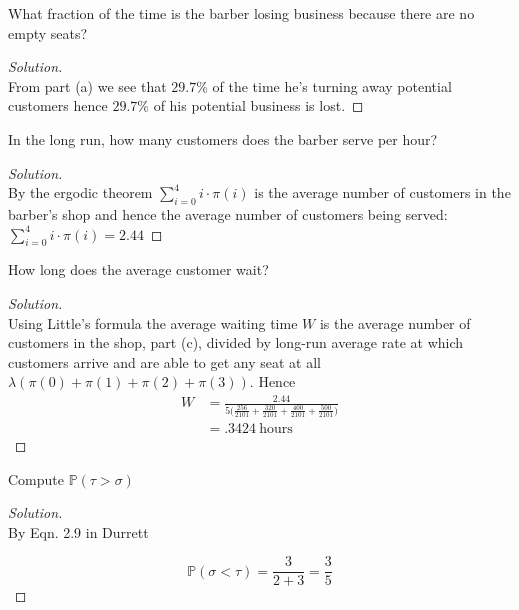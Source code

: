 \documentclass[12pt]{article}
\newenvironment{problem}[2][Problem]{\begin{trivlist}
\item[\hskip \labelsep {\bfseries #1}\hskip \labelsep {\bfseries #2.}]}{\end{trivlist}}
\newenvironment{solution}
  {\begin{proof}[Solution]\renewcommand{\qedsymbol}{}}
  {\end{proof}}
\begin{document}
\begin{problem}{2(b)} 
What fraction of the time is the barber losing business because there are no empty seats?
\end{problem}
\begin{solution}\ \\

From part (a) we see that $29.7\%$ of the time he's turning away potential customers hence $29.7\%$ of his potential business is lost.
\end{solution}

\begin{problem}{2(c)} 
In the long run, how many customers does the barber serve per hour?
\end{problem}
\begin{solution}\ \\

By the ergodic theorem $\sum_{i=0}^4 i\cdot \pi(i)$ is the average number of customers in the barber's shop and hence the average number of customers being served: $\sum_{i=0}^4 i\cdot \pi(i) = 2.44 $

\end{solution}

\begin{problem}{2(d)} 
How long does the average customer wait?
\end{problem}
\begin{solution}\ \\

Using Little's formula the average waiting time $W$ is the average number of customers in the shop, part (c), divided by long-run average rate at which customers arrive and are able to get any seat at all $\lambda(\pi(0)+\pi(1)+\pi(2)+\pi(3))$. Hence
\begin{align*}
W &= \frac{2.44}{5\bigg(\frac{256}{2101} + \frac{320}{2101} + \frac{400}{2101} +  \frac{500}{2101}\bigg)} \\
&= .3424 ~\text{hours}
\end{align*}

\end{solution}

\begin{problem}{3(a)}

Compute $\mathbb{P}({\tau > \sigma})$

\end{problem}
\begin{solution}\ \\

By Eqn. 2.9 in Durrett 

$$
\mathbb{P}({\sigma<\tau}) = \frac{3}{2+3} = \frac{3}{5}
$$

\end{solution}
\end{document}
